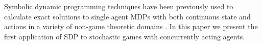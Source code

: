Symbolic dynamic programming techniques have been previously used to calculate
exact solutions to single agent MDPs with both continuous state and actions
in a variety of non-game theoretic domains \cite{Sanner_UAI_2011,Zamani_AAAI_2012}.
In this paper we present the first application of SDP to stochastic games
with concurrently acting agents.

%





